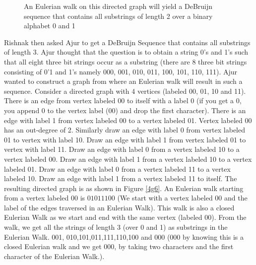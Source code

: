\begin{figure}
\begin{center}
\caption{ An Eulerian walk on this directed graph will yield a DeBruijn sequence that contains  all substrings of length 2 over a binary alphabet 0 and 1}\label{4g55}
\end{center}
\end{figure}
Rishnak then asked Ajur to get a DeBruijn Sequence that contains all substrings of length 3.
Ajur thought that the question is to obtain a string 0's and 1's such that all eight three bit strings occur as a substring (there are 8 three bit strings consisting of 0'1 and 1's namely 000, 001, 010, 011, 100, 101, 110, 111). Ajur wanted to construct a graph from where an Eulerian walk will result in such a sequence.  Consider a directed graph with 4 vertices (labeled 00, 01, 10 and 11).
There is an edge from vertex labeled 00 to itself with a label 0 (if you get a 0, you append 0 to the vertex label (00) and drop the first character). There is an edge with label 1 from
vertex labeled 00 to a vertex labeled 01. Vertex labeled 00 has an out-degree of 2. Similarly draw an edge with label 0 from vertex labeled 01 to vertex with label 10. Draw an edge with label 1 from vertex labeled 01 to vertex with label 11. 
Draw an edge with label 0 from a  vertex labeled 10 to a vertex labeled 00. Draw an edge with label 1 from a vertex labeled 10 to a vertex labeled 01.
Draw an edge with label 0 from a vertex labeled 11 to a vertex labeled 10. Draw an edge with label 1 from a vertex labeled 11 to itself.
The resulting directed graph is as shown in Figure \ref{4g6}. An Eulerian walk starting from a vertex labeled 00 is $0 1 0 1 1 1 0 0$  (We start with a vertex labeled 00 and the label of the edges traversed in an Eulerian Walk). This walk is also a closed Eulerian Walk as we start and end with the same vertex (labeled $00$).
From the walk, we get all the strings of length 3 (over 0 and 1) as substrings in the Eulerian Walk.
001, 010,101,011,111,110,100 and 000 (000 by knowing this is a closed Eulerian walk and we get 000, by taking two characters and the first character of the Eulerian Walk.).
